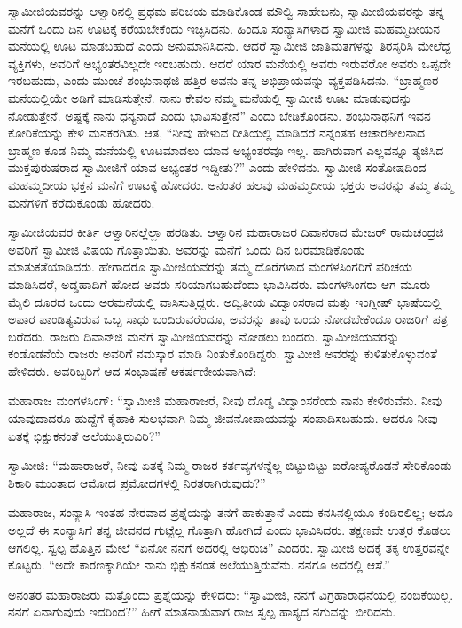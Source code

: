  ಸ್ವಾಮೀಜಿಯವರನ್ನು ಆಳ್ವಾರಿನಲ್ಲಿ ಪ್ರಥಮ ಪರಿಚಯ ಮಾಡಿಕೊಂಡ ಮೌಲ್ವಿ ಸಾಹೇಬನು, ಸ್ವಾಮೀಜಿಯವರನ್ನು ತನ್ನ ಮನೆಗೆ ಒಂದು ದಿನ ಊಟಕ್ಕೆ ಕರೆಯಬೇಕೆಂದು ಇಚ್ಛಿಸಿದನು. ಹಿಂದೂ ಸಂನ್ಯಾಸಿಗಳಾದ ಸ್ವಾಮೀಜಿ ಮಹಮ್ಮದೀಯನ ಮನೆಯಲ್ಲಿ ಊಟ ಮಾಡಬಹುದೆ ಎಂದು ಅನುಮಾನಿಸಿದನು. ಆದರೆ ಸ್ವಾಮೀಜಿ ಜಾತಿಮತಗಳನ್ನು ತಿರಸ್ಕರಿಸಿ ಮೇಲೆದ್ದ ವ್ಯಕ್ತಿಗಳು, ಅವರಿಗೆ ಅಭ್ಯಂತರವಿಲ್ಲದೇ ಇರಬಹುದು. ಆದರೆ ಯಾರ ಮನೆಯಲ್ಲಿ ಅವರು ಇರುವರೋ ಅವರು ಒಪ್ಪದೇ ಇರಬಹುದು, ಎಂದು ಮುಂಚೆ ಶಂಭುನಾಥಜಿ ಹತ್ತಿರ ಅವನು ತನ್ನ ಅಭಿಪ್ರಾಯವನ್ನು ವ್ಯಕ್ತಪಡಿಸಿದನು. “ಬ್ರಾಹ್ಮಣರ ಮನೆಯಲ್ಲಿಯೇ ಅಡಿಗೆ ಮಾಡಿಸುತ್ತೇನೆ. ನಾನು ಕೇವಲ ನಮ್ಮ ಮನೆಯಲ್ಲಿ ಸ್ವಾಮೀಜಿ ಊಟ ಮಾಡುವುದನ್ನು ನೋಡುತ್ತೇನೆ. ಅಷ್ಟಕ್ಕೆ ನಾನು ಧನ್ಯನಾದೆ ಎಂದು ಭಾವಿಸುತ್ತೇನೆ” ಎಂದು ಬೇಡಿಕೊಂಡನು. ಶಂಭುನಾಥನಿಗೆ ಇವನ ಕೋರಿಕೆಯನ್ನು ಕೇಳಿ ಮನಕರಗಿತು. ಆತ, “ನೀವು ಹೇಳುವ ರೀತಿಯಲ್ಲಿ ಮಾಡಿದರೆ ನನ್ನಂತಹ ಆಚಾರಶೀಲನಾದ ಬ್ರಾಹ್ಮಣ ಕೂಡ ನಿಮ್ಮ ಮನೆಯಲ್ಲಿ ಊಟಮಾಡಲು ಯಾವ ಅಭ್ಯಂತರವೂ ಇಲ್ಲ. ಹಾಗಿರುವಾಗ ಎಲ್ಲವನ್ನೂ ತ್ಯಜಿಸಿದ ಮುಕ್ತಪುರುಷರಾದ ಸ್ವಾಮೀಜಿಗೆ ಯಾವ ಅಭ್ಯಂತರ ಇದ್ದೀತು?” ಎಂದು ಹೇಳಿದನು. ಸ್ವಾಮೀಜಿ ಸಂತೋಷದಿಂದ ಮಹಮ್ಮದೀಯ ಭಕ್ತನ ಮನೆಗೆ ಊಟಕ್ಕೆ ಹೋದರು. ಅನಂತರ ಹಲವು ಮಹಮ್ಮದೀಯ ಭಕ್ತರು ಅವರನ್ನು ತಮ್ಮ ತಮ್ಮ ಮನೆಗಳಿಗೆ ಕರೆದುಕೊಂಡು ಹೋದರು. 

 ಸ್ವಾಮೀಜಿಯವರ ಕೀರ್ತಿ ಆಳ್ವಾರಿನಲ್ಲೆಲ್ಲಾ ಹರಡಿತು. ಆಳ್ವಾರಿನ ಮಹಾರಾಜರ ದಿವಾನರಾದ ಮೇಜರ್ ರಾಮಚಂದ್ರಜಿ ಅವರಿಗೆ ಸ್ವಾಮೀಜಿ ವಿಷಯ ಗೊತ್ತಾಯಿತು. ಅವರನ್ನು ಮನೆಗೆ ಒಂದು ದಿನ ಬರಮಾಡಿಕೊಂಡು ಮಾತುಕತೆಯಾಡಿದರು. ಹೇಗಾದರೂ ಸ್ವಾಮೀಜಿಯವರನ್ನು ತಮ್ಮ ದೊರೆಗಳಾದ ಮಂಗಳಸಿಂಗರಿಗೆ ಪರಿಚಯ ಮಾಡಿಸಿದರೆ, ಅಡ್ಡಹಾದಿಗೆ ಹೋದ ಅವರು ಸರಿಯಾಗಬಹುದೆಂದು ಭಾವಿಸಿದರು. ಮಂಗಳಸಿಂಗರು ಆಗ ಮೂರು ಮೈಲಿ ದೂರದ ಒಂದು ಅರಮನೆಯಲ್ಲಿ ವಾಸಿಸುತ್ತಿದ್ದರು. ಅದ್ವಿತೀಯ ವಿದ್ವಾಂಸರಾದ ಮತ್ತು ಇಂಗ್ಲೀಷ್ ಭಾಷೆಯಲ್ಲಿ ಅಪಾರ ಪಾಂಡಿತ್ಯವಿರುವ ಒಬ್ಬ ಸಾಧು ಬಂದಿರುವರೆಂದೂ, ಅವರನ್ನು ತಾವು ಬಂದು ನೋಡಬೇಕೆಂದೂ ರಾಜರಿಗೆ ಪತ್ರ ಬರೆದರು. ರಾಜರು ದಿವಾನ್‍ಜಿ ಮನೆಗೆ ಸ್ವಾಮೀಜಿಯವರನ್ನು ನೋಡಲು ಬಂದರು. ಸ್ವಾಮೀಜಿಯವರನ್ನು ಕಂಡೊಡನೆಯೆ ರಾಜರು ಅವರಿಗೆ ನಮಸ್ಕಾರ ಮಾಡಿ ನಿಂತುಕೊಂಡಿದ್ದರು. ಸ್ವಾಮೀಜಿ ಅವರನ್ನು ಕುಳಿತುಕೊಳ್ಳುವಂತೆ ಹೇಳಿದರು. ಅವರಿಬ್ಬರಿಗೆ ಆದ ಸಂಭಾಷಣೆ ಆಕರ್ಷಣೀಯವಾಗಿದೆ: 

 ಮಹಾರಾಜ ಮಂಗಳಸಿಂಗ್: “ಸ್ವಾಮೀಜಿ ಮಹಾರಾಜರೆ, ನೀವು ದೊಡ್ಡ ವಿದ್ವಾಂಸರೆಂದು ನಾನು ಕೇಳಿರುವೆನು. ನೀವು ಯಾವುದಾದರೂ ಹುದ್ದೆಗೆ ಕೈಹಾಕಿ ಸುಲಭವಾಗಿ ನಿಮ್ಮ ಜೀವನೋಪಾಯವನ್ನು ಸಂಪಾದಿಸಬಹುದು. ಆದರೂ ನೀವು ಏತಕ್ಕೆ ಭಿಕ್ಷುಕನಂತೆ ಅಲೆಯುತ್ತಿರುವಿರಿ?” 

 ಸ್ವಾಮೀಜಿ: “ಮಹಾರಾಜರೆ, ನೀವು ಏತಕ್ಕೆ ನಿಮ್ಮ ರಾಜರ ಕರ್ತವ್ಯಗಳನ್ನೆಲ್ಲ ಬಿಟ್ಟುಬಿಟ್ಟು ಐರೋಪ್ಯರೊಡನೆ ಸೇರಿಕೊಂಡು ಶಿಕಾರಿ ಮುಂತಾದ ಆಮೋದ ಪ್ರಮೋದಗಳಲ್ಲಿ ನಿರತರಾಗಿರುವುದು?” 

 ಮಹಾರಾಜ, ಸಂನ್ಯಾಸಿ ಇಂತಹ ನೇರವಾದ ಪ್ರಶ್ನೆಯನ್ನು ತನಗೆ ಹಾಕುತ್ತಾನೆ ಎಂದು ಕನಸಿನಲ್ಲಿಯೂ ಕಂಡಿರಲಿಲ್ಲ; ಅದೂ ಅಲ್ಲದೆ ಈ ಸಂನ್ಯಾಸಿಗೆ ತನ್ನ ಜೀವನದ ಗುಟ್ಟೆಲ್ಲ ಗೊತ್ತಾಗಿ ಹೋಗಿದೆ ಎಂದು ಭಾವಿಸಿದರು. ತಕ್ಷಣವೇ ಉತ್ತರ ಕೊಡಲು ಆಗಲಿಲ್ಲ. ಸ್ವಲ್ಪ ಹೊತ್ತಿನ ಮೇಲೆ “ಏನೋ ನನಗೆ ಅದರಲ್ಲಿ ಅಭಿರುಚಿ” ಎಂದರು. ಸ್ವಾಮೀಜಿ ಅದಕ್ಕೆ ತಕ್ಕ ಉತ್ತರವನ್ನೇ ಕೊಟ್ಟರು. “ಅದೇ ಕಾರಣಕ್ಕಾಗಿಯೇ ನಾನು ಭಿಕ್ಷುಕನಂತೆ ಅಲೆಯುತ್ತಿರುವೆನು. ನನಗೂ ಅದರಲ್ಲಿ ಆಸೆ.” 

 ಅನಂತರ ಮಹಾರಾಜರು ಮತ್ತೊಂದು ಪ್ರಶ್ನೆಯನ್ನು ಕೇಳಿದರು: “ಸ್ವಾಮೀಜಿ, ನನಗೆ ವಿಗ್ರಹಾರಾಧನೆಯಲ್ಲಿ ನಂಬಿಕೆಯಿಲ್ಲ. ನನಗೆ ಏನಾಗುವುದು ಇದರಿಂದ?” ಹೀಗೆ ಮಾತನಾಡುವಾಗ ರಾಜ ಸ್ವಲ್ಪ ಹಾಸ್ಯದ ನಗುವನ್ನು ಬೀರಿದನು. 

